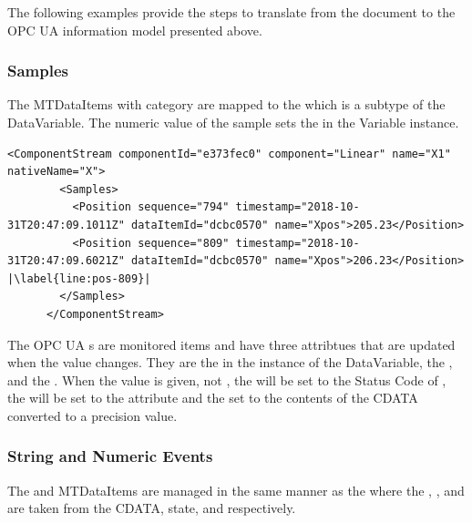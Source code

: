 The following examples provide the steps to translate from the  document to the OPC UA information model presented above.

\subsubsection{Samples}

The \glspl{MTDataItem} with \gls{category}  are mapped to the  which is a subtype of the  \gls{DataVariable}. The numeric value of the sample sets the  in the  \gls{Variable} instance.

\begin{lstlisting}[firstnumber=last,escapechar=|,%
    caption={Linear Component Stream},label={lst:linear-component-stream}]
      <ComponentStream componentId="e373fec0" component="Linear" name="X1" nativeName="X"> 
        <Samples>
          <Position sequence="794" timestamp="2018-10-31T20:47:09.1011Z" dataItemId="dcbc0570" name="Xpos">205.23</Position>
          <Position sequence="809" timestamp="2018-10-31T20:47:09.6021Z" dataItemId="dcbc0570" name="Xpos">206.23</Position> |\label{line:pos-809}|
        </Samples>
      </ComponentStream>
\end{lstlisting}

The OPC UA s are monitored items and have three attribtues that are updated when the value changes. They are the  in the instance of the \gls{DataVariable}, the , and the . When the value is given, not , the  will be set to the Status Code of , the  will be set to the  attribute and the  set to the contents of the \gls{CDATA} converted to a  precision value.

\subsubsection{String and Numeric Events}\label{sec:sting-numeric-events}

The  and  \glspl{MTDataItem} are managed in the same manner as the  where the , , and  are taken from the \gls{CDATA},  state, and  respectively.


